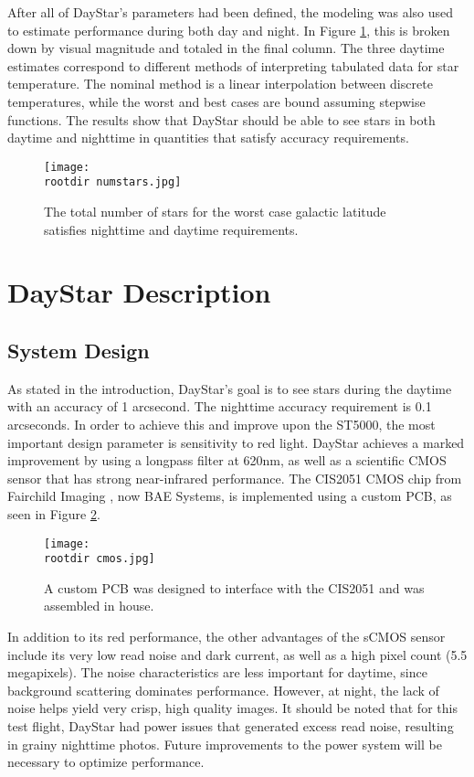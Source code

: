 \documentclass[twocolumn,letterpaper]{IEEEAerospace2012}
\newcommand{\rootdir}{./Figures/}
\begin{document}
After all of DayStar's parameters had been defined, the modeling was also used to estimate performance during both day and night. In Figure \ref{fig:numstars_nick}, this is broken down by visual magnitude and totaled in the final column. The three daytime estimates correspond to different methods of interpreting tabulated data for star temperature. The nominal method is a linear interpolation between discrete temperatures, while the worst and best cases are bound assuming stepwise functions. The results show that DayStar should be able to see stars in both daytime and nighttime in quantities that satisfy accuracy requirements.
\begin{figure}
    \texttt{[image: \\rootdir numstars.jpg]}
    \caption{The total number of stars for the worst case galactic latitude satisfies nighttime and daytime requirements.}
    \label{fig:numstars_nick}
\end{figure}

\section{DayStar Description}

\subsection{System Design}
As stated in the introduction, DayStar's goal is to see stars during the daytime with an accuracy of 1 arcsecond. The nighttime accuracy requirement is 0.1 arcseconds. In order to achieve this and improve upon the ST5000, the most important design parameter is sensitivity to red light. DayStar achieves a marked improvement by using a longpass filter at 620nm, as well as a scientific CMOS sensor that has strong near-infrared performance. The CIS2051 CMOS chip from Fairchild Imaging \cite{fairchild}, now BAE Systems, is implemented using a custom PCB, as seen in Figure \ref{fig:cmos}.
\begin{figure}[H]
    \texttt{[image: \\rootdir cmos.jpg]}
    \caption{A custom PCB was designed to interface with the CIS2051 and was assembled in house.}
    \label{fig:cmos}
\end{figure}
In addition to its red performance, the other advantages of the sCMOS sensor include its very low read noise and dark current, as well as a high pixel count (5.5 megapixels). The noise characteristics are less important for daytime, since background scattering dominates performance. However, at night, the lack of noise helps yield very crisp, high quality images. It should be noted that for this test flight, DayStar had power issues that generated excess read noise, resulting in grainy nighttime photos. Future improvements to the power system will be necessary to optimize performance.
\end{document}
